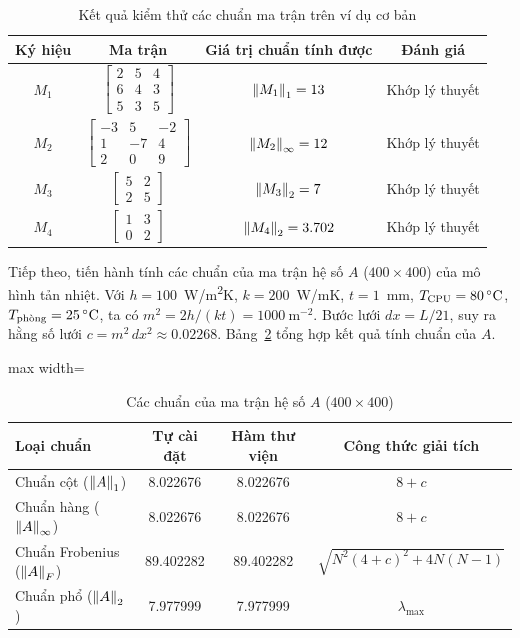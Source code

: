 \begin{table}[H]
\centering
\caption{Kết quả kiểm thử các chuẩn ma trận trên ví dụ cơ bản}
\label{tab:kiemthu}
\begin{tabular}{cccc}
\toprule
Ký hiệu & Ma trận & Giá trị chuẩn tính được & Đánh giá \\
\midrule
$M_1$ & $\begin{bmatrix} 2 & 5 & 4\\ 6 & 4 & 3\\ 5 & 3 & 5 \end{bmatrix}$ & $\left\lVert M_1 \right\rVert_1 = 13$ & Khớp lý thuyết \\[16pt]
$M_2$ & $\begin{bmatrix} -3 & 5 & -2\\ 1 & -7 & 4\\ 2 & 0 & 9 \end{bmatrix}$ & $\left\lVert M_2 \right\rVert_\infty = 12$ & Khớp lý thuyết \\[16pt]
$M_3$ & $\begin{bmatrix} 5 & 2\\ 2 & 5 \end{bmatrix}$ & $\left\lVert M_3 \right\rVert_2 = 7$ & Khớp lý thuyết \\[12pt]
$M_4$ & $\begin{bmatrix} 1 & 3\\ 0 & 2 \end{bmatrix}$ & $\left\lVert M_4 \right\rVert_2 = 3.702$ & Khớp lý thuyết \\
\bottomrule
\end{tabular}
\end{table}

Tiếp theo, tiến hành tính các chuẩn của ma trận hệ số $A$ ($400\times 400$) của mô hình tản nhiệt.
Với $h = 100$~W/m\textsuperscript{2}K, $k = 200$~W/mK, $t = 1$~mm, $T_{\mathrm{CPU}} = 80\,^{\circ}\mathrm{C}$, $T_{\text{phòng}} = 25\,^{\circ}\mathrm{C}$,
ta có $m^2 = 2h/(kt) = 1000~\mathrm{m}^{-2}$. Bước lưới $dx = L/21$, suy ra hằng số lưới $c = m^2\, dx^2 \approx 0.02268$.
Bảng~\ref{tab:chuanA} tổng hợp kết quả tính chuẩn của $A$.

\begin{table}[H]
\centering
\caption{Các chuẩn của ma trận hệ số $A$ ($400\times 400$)}
\label{tab:chuanA}
\begin{adjustbox}{max width=\textwidth}
\begin{tabular}{lccc}
\toprule
Loại chuẩn & Tự cài đặt & Hàm thư viện & Công thức giải tích \\
\midrule
Chuẩn cột ($\left\lVert A \right\rVert_1$) & 8.022676 & 8.022676 & $8 + c$ \\
Chuẩn hàng ($\left\lVert A \right\rVert_\infty$) & 8.022676 & 8.022676 & $8 + c$ \\
Chuẩn Frobenius ($\left\lVert A \right\rVert_F$) & 89.402282 & 89.402282 & $\sqrt{N^2(4+c)^2 + 4N(N-1)}$ \\
Chuẩn phổ ($\left\lVert A \right\rVert_2$) & 7.977999 & 7.977999 & $\lambda_{\max}$ \\
\bottomrule
\end{tabular}
\end{adjustbox}
\end{table}

